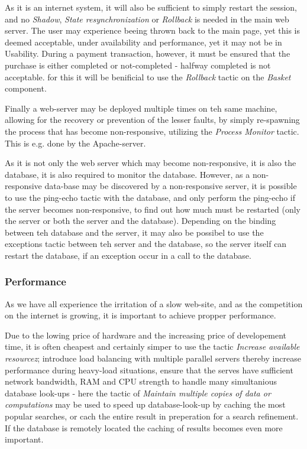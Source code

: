 As it is an internet system, it will also be sufficient to simply restart the session, and no \emph{Shadow}, \emph{State resynchronization} or \emph{Rollback} is needed in the main web server. The user may experience beeing thrown back to the main page, yet this is deemed acceptable, under availability and performance, yet it may not be in Usability. During a payment transaction, however, it must be ensured that the purchase is either completed or not-completed - halfway completed is not acceptable. for this it will be benificial to use the \emph{Rollback} tactic on the \emph{Basket} component.

Finally a web-server may be deployed multiple times on teh same machine, allowing for the recovery or prevention of the lesser faults, by simply re-spawning the process that has become non-responsive, utilizing the \emph{Process Monitor} tactic. This is e.g. done by the Apache-server.

As it is not only the web server which may become non-responsive, it is also the database, it is also required to monitor the database. However, as a non-responsive data-base may be discovered by a non-responsive server, it is possible to use the ping-echo tactic with the database, and only perform the ping-echo if the server becomes non-responsive, to find out how much must be restarted (only the server or both the server and the database). 
Depending on the binding between teh database and the server, it may also be possibel to use the exceptions tactic between teh server and the database, so the server itself can restart the database, if an exception occur in a call to the database. 

\subsubsection{Performance}

As we have all experience the irritation of a slow web-site, and as the competition on the internet is growing, it is important to achieve propper performance.

Due to the lowing price of hardware and the increasing price of developement time, it is often cheapest and certainly simper to use the tactic \emph{Increase available resourcez}; introduce load balancing with multiple parallel servers thereby increase performance during heavy-load situations, ensure that the serves have sufficient network bandwidth, RAM and CPU strength to handle many simultanious database look-ups - here the tactic of \emph{Maintain multiple copies of data or computations} may be used to speed up database-look-up by caching the most popular searches, or cach the entire result in preperation for a search refinement. If the database is remotely located the caching of results becomes even more important.

